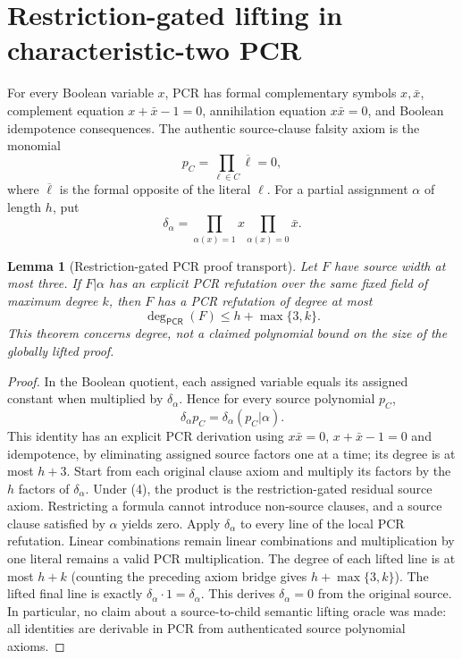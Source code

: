 \documentclass[11pt]{article}
\newtheorem{lemma}[theorem]{Lemma}
\newcommand{\PCR}{\mathsf{PCR}}
\begin{document}
\section{Restriction-gated lifting in characteristic-two PCR}
For every Boolean variable $x$, PCR has formal complementary symbols $x,\bar x$, complement equation $x+\bar x-1=0$, annihilation equation $x\bar x=0$, and Boolean idempotence consequences. The authentic source-clause falsity axiom is the monomial
\[
 p_C=\prod_{\ell\in C}\overline\ell=0,
\tag{1}
\]
where $\overline\ell$ is the formal opposite of the literal $\ell$. For a partial assignment $\alpha$ of length $h$, put
\[
 \delta_\alpha=\prod_{\alpha(x)=1}x\prod_{\alpha(x)=0}\bar x.
\tag{2}
\]

\begin{lemma}[Restriction-gated PCR proof transport]\label{lem:lift}
Let $F$ have source width at most three. If $F|\alpha$ has an explicit PCR refutation over the same fixed field of maximum degree $k$, then $F$ has a PCR refutation of degree at most
\[
 \boxed{\deg_{\PCR}(F)\le h+\max\{3,k\}.}\tag{3}
\]
This theorem concerns degree, not a claimed polynomial bound on the size of the globally lifted proof.
\end{lemma}
\begin{proof}
In the Boolean quotient, each assigned variable equals its assigned constant when multiplied by $\delta_\alpha$. Hence for every source polynomial $p_C$,
\[\delta_\alpha p_C=\delta_\alpha(p_C|\alpha).\tag{4}\]
This identity has an explicit PCR derivation using $x\bar x=0$, $x+\bar x-1=0$ and idempotence, by eliminating assigned source factors one at a time; its degree is at most $h+3$. Start from each original clause axiom and multiply its factors by the $h$ factors of $\delta_\alpha$. Under (4), the product is the restriction-gated residual source axiom. Restricting a formula cannot introduce non-source clauses, and a source clause satisfied by $\alpha$ yields zero. Apply $\delta_\alpha$ to every line of the local PCR refutation. Linear combinations remain linear combinations and multiplication by one literal remains a valid PCR multiplication. The degree of each lifted line is at most $h+k$ (counting the preceding axiom bridge gives $h+\max\{3,k\}$). The lifted final line is exactly $\delta_\alpha\cdot1=\delta_\alpha$. This derives $\delta_\alpha=0$ from the original source. In particular, no claim about a source-to-child semantic lifting oracle was made: all identities are derivable in PCR from authenticated source polynomial axioms.
\end{proof}
\end{document}
